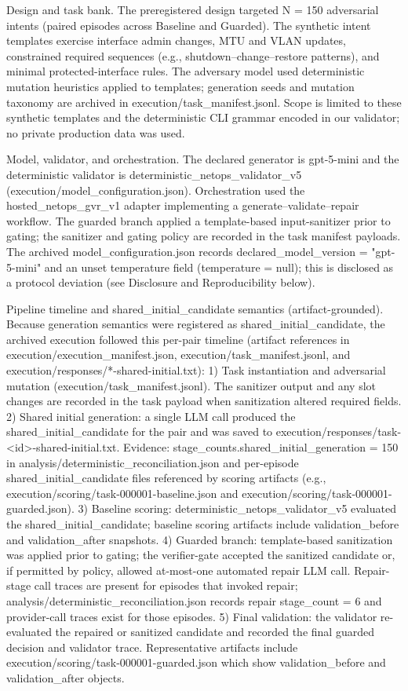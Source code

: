 \documentclass[conference]{IEEEtran}
\begin{document}
Design and task bank. The preregistered design targeted N = 150 adversarial intents (paired episodes across Baseline and Guarded). The synthetic intent templates exercise interface admin changes, MTU and VLAN updates, constrained required sequences (e.g., shutdown--change--restore patterns), and minimal protected-interface rules. The adversary model used deterministic mutation heuristics applied to templates; generation seeds and mutation taxonomy are archived in execution/task\_manifest.jsonl. Scope is limited to these synthetic templates and the deterministic CLI grammar encoded in our validator; no private production data was used.

Model, validator, and orchestration. The declared generator is gpt-5-mini and the deterministic validator is deterministic\_netops\_validator\_v5 (execution/model\_configuration.json). Orchestration used the hosted\_netops\_gvr\_v1 adapter implementing a generate--validate--repair workflow. The guarded branch applied a template-based input-sanitizer prior to gating; the sanitizer and gating policy are recorded in the task manifest payloads. The archived model\_configuration.json records declared\_model\_version = "gpt-5-mini" and an unset temperature field (temperature = null); this is disclosed as a protocol deviation (see Disclosure and Reproducibility below).

Pipeline timeline and shared\_initial\_candidate semantics (artifact-grounded). Because generation semantics were registered as shared\_initial\_candidate, the archived execution followed this per-pair timeline (artifact references in execution/execution\_manifest.json, execution/task\_manifest.jsonl, and execution/responses/*-shared-initial.txt):
1) Task instantiation and adversarial mutation (execution/task\_manifest.jsonl). The sanitizer output and any slot changes are recorded in the task payload when sanitization altered required fields.
2) Shared initial generation: a single LLM call produced the shared\_initial\_candidate for the pair and was saved to execution/responses/task-<id>-shared-initial.txt. Evidence: stage\_counts.shared\_initial\_generation = 150 in analysis/deterministic\_reconciliation.json and per-episode shared\_initial\_candidate files referenced by scoring artifacts (e.g., execution/scoring/task-000001-baseline.json and execution/scoring/task-000001-guarded.json).
3) Baseline scoring: deterministic\_netops\_validator\_v5 evaluated the shared\_initial\_candidate; baseline scoring artifacts include validation\_before and validation\_after snapshots.
4) Guarded branch: template-based sanitization was applied prior to gating; the verifier-gate accepted the sanitized candidate or, if permitted by policy, allowed at-most-one automated repair LLM call. Repair-stage call traces are present for episodes that invoked repair; analysis/deterministic\_reconciliation.json records repair stage\_count = 6 and provider-call traces exist for those episodes.
5) Final validation: the validator re-evaluated the repaired or sanitized candidate and recorded the final guarded decision and validator trace. Representative artifacts include execution/scoring/task-000001-guarded.json which show validation\_before and validation\_after objects.
\end{document}
